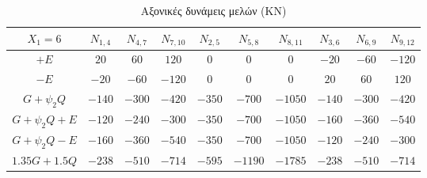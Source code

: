 \begin{landscape}
\begin{table}[h]
\centering\footnotesize
\begin{tabular}{| c || c | c | c | c | c | c | c | c | c |}
\hline
$X_1 = 6$ & $N_{1,4}$ & $N_{4,7}$ & $N_{7,10}$ & $N_{2,5}$ & $N_{5,8}$ & $N_{8,11}$ & $N_{3,6}$ & $N_{6,9}$ & $N_{9,12}$ \\
\hline
\hline
$+E$ & $20$ & $60$ & $120$ & $0$ & $0$ & $0$ & $-20$ & $-60$ & $-120$ \\
\hline
$-E$ & $-20$ & $-60$ & $-120$ & $0$ & $0$ & $0$ & $20$ & $60$ & $120$ \\
\hline
$G+\psi_2 Q$ & $-140$ & $-300$ & $-420$ & $-350$ & $-700$ & $-1050$ & $-140$ & $-300$ & $-420$ \\
\hline
$G+\psi_2Q+E$ & $-120$ & $-240$ & $-300$ & $-350$ & $-700$ & $-1050$ & $-160$ & $-360$ & $-540$ \\
\hline
$G+\psi_2Q-E$ & $-160$ & $-360$ & $-540$ & $-350$ & $-700$ & $-1050$ & $-120$ & $-240$ & $-300$ \\
\hline
$1.35G+1.5Q$ & $-238$ & $-510$ & $-714$ & $-595$ & $-1190$ & $-1785$ & $-238$ & $-510$ & $-714$ \\
\hline
\end{tabular}
\caption{Αξονικές δυνάμεις μελών (\textlatin{KN})}
\label{tab:axialloads}
\end{table}

\end{landscape}
